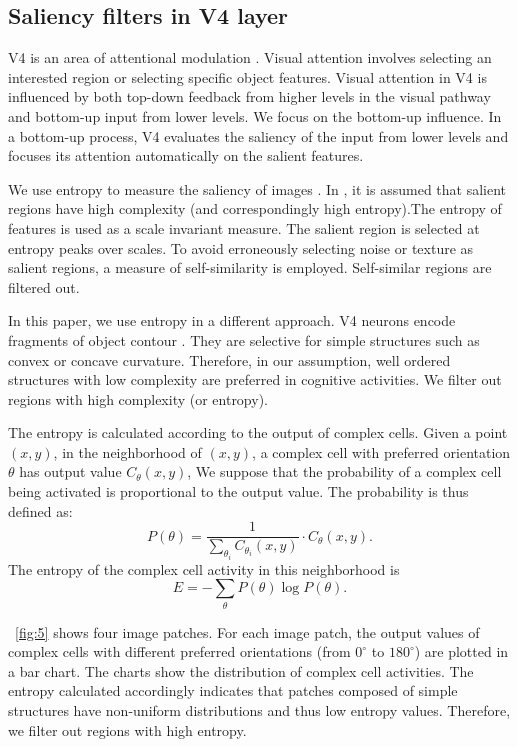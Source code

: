 \documentclass[5p]{elsarticle}
\begin{document}
\subsection{Saliency filters in V4 layer}

V4 is an area of attentional modulation \cite{roe2012}.
Visual attention involves selecting an interested region or selecting specific object features.
Visual attention in V4 is influenced by both top-down feedback from higher levels in the visual pathway
and bottom-up input from lower levels.
We focus on the bottom-up influence.
In a bottom-up process, V4 evaluates the saliency of the input from lower levels
and focuses its attention automatically on the salient features.

We use entropy to measure the saliency of images \cite{kadir2001}.
In \cite{kadir2001}, it is assumed that salient regions have high complexity (and correspondingly high entropy).The entropy of features is used as a scale invariant measure.
The salient region is selected at entropy peaks over scales.
To avoid erroneously selecting noise or texture as salient regions,
a measure of self-similarity is employed.
Self-similar regions are filtered out.

In this paper, we use entropy in a different approach.
V4 neurons encode fragments of object contour \cite{pasupathy2001,pasupathy2002}.
They are selective for simple structures such as convex or concave curvature.
Therefore, in our assumption, 
well ordered structures with low complexity are preferred in cognitive activities.
We filter out regions with high complexity (or entropy).

The entropy is calculated according to the output of complex cells.
Given a point $(x,y)$, in the neighborhood of $(x,y)$,
a complex cell with preferred orientation $\theta$ has output value $C_{\theta}(x,y)$,
We suppose that the probability of a complex cell being activated
is proportional to the output value.
The probability is thus defined as:
\begin{equation}
P(\theta)=\frac{1}{\sum_{\theta_i} C_{\theta_i}(x,y)}\cdot C_{\theta}(x,y).
\end{equation}
The entropy of the complex cell activity in this neighborhood
is 
\begin{equation}
E=-\sum_{\theta} P(\theta) \log P(\theta).
\end{equation}

\figurename~\ref{fig:5} shows four image patches.
For each image patch, the output values of complex cells with different preferred orientations
(from $0^\circ$ to $180^\circ$) are plotted in a bar chart.
The charts show the distribution of complex cell activities.
The entropy calculated accordingly indicates that 
patches composed of simple structures have non-uniform distributions and thus low entropy values.
Therefore, we filter out regions with high entropy.
\end{document}
